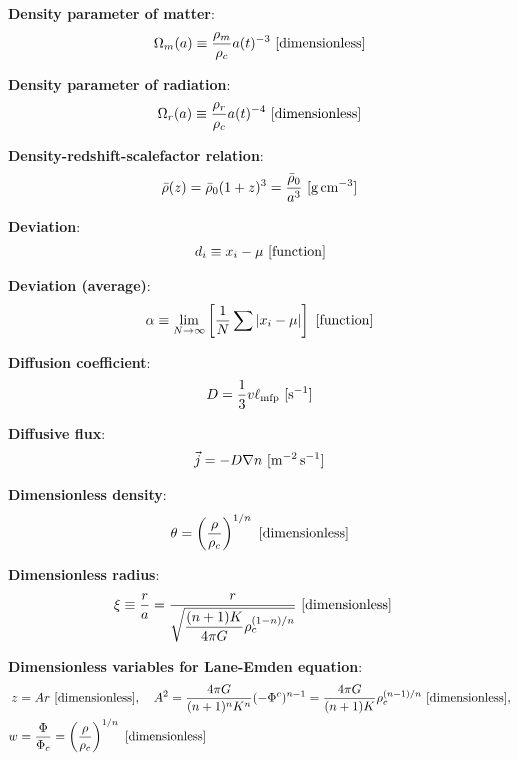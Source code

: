 \documentclass[a4paper,10pt]{article}
\begin{document}
{\noindent}\textbf{Density parameter of matter}:
\begin{align*}
    \Omega_m(a) \equiv \dfrac{\rho_m}{\rho_c}a(t)^{-3} ~ [{\rm dimensionless}]
\end{align*}

{\noindent}\textbf{Density parameter of radiation}:
\begin{align*}
    \Omega_r(a) \equiv \dfrac{\rho_r}{\rho_c}a(t)^{-4} ~ [{\rm dimensionless}]
\end{align*}

{\noindent}\textbf{Density-redshift-scalefactor relation}:
\begin{align*}
    \bar{\rho}(z) = \bar{\rho}_0(1+z)^3 = \frac{\bar{\rho}_0}{a^3} ~ [{\rm g\,cm^{-3}}]
\end{align*}

{\noindent}\textbf{Deviation}:
\begin{align*}
    d_i \equiv x_i - \mu ~ [{\rm function}]
\end{align*}

{\noindent}\textbf{Deviation (average)}:
\begin{align*}
    \alpha \equiv \lim_{N\rightarrow\infty}\left[ \frac{1}{N} \sum \left\lvert x_i-\mu\right\rvert \right] ~ [{\rm function}]
\end{align*}

{\noindent}\textbf{Diffusion coefficient}:
\begin{align*}
    D = \frac{1}{3}v\ell_{\rm mfp} ~ [{\rm s^{-1}}]
\end{align*}

{\noindent}\textbf{Diffusive flux}:
\begin{align*}
    \vec{j} = -D\nabla n ~ [{\rm m^{-2}\,s^{-1}}]
\end{align*}

{\noindent}\textbf{Dimensionless density}:
\begin{align*}
    \theta = \left(\frac{\rho}{\rho_c}\right)^{1/n} ~ [{\rm dimensionless}]
\end{align*}

{\noindent}\textbf{Dimensionless radius}:
\begin{align*}
    \xi &\equiv \frac{r}{a} = \frac{r}{\sqrt{\dfrac{(n+1)K}{4\pi G}\rho_c^{(1-n)/n}}} ~ [{\rm dimensionless}]
\end{align*}

{\noindent}\textbf{Dimensionless variables for Lane-Emden equation}:
\begin{align*}
    z &= Ar ~ [{\rm dimensionless}], ~~~ A^2 = \frac{4\pi G}{(n+1)^nK^n}(-\Phi^c)^{n-1} = \frac{4\pi G}{(n+1)K}\rho_c^{(n-1)/n} ~ [{\rm dimensionless}],\\
    w &= \frac{\Phi}{\Phi_c} = \left(\frac{\rho}{\rho_c}\right)^{1/n} ~ [{\rm dimensionless}]
\end{align*}
\end{document}
